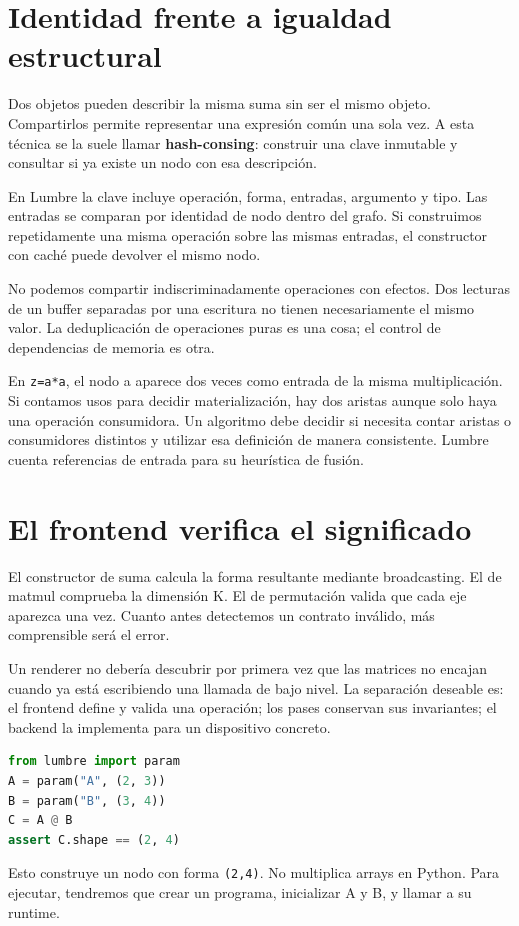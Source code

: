 \documentclass[12pt,a4paper,oneside]{report}
\begin{document}
\section{Identidad frente a igualdad estructural}
Dos objetos pueden describir la misma suma sin ser el mismo objeto. Compartirlos permite representar una expresión común una sola vez. A esta técnica se la suele llamar \textbf{hash-consing}: construir una clave inmutable y consultar si ya existe un nodo con esa descripción.

En Lumbre la clave incluye operación, forma, entradas, argumento y tipo. Las entradas se comparan por identidad de nodo dentro del grafo. Si construimos repetidamente una misma operación sobre las mismas entradas, el constructor con caché puede devolver el mismo nodo.

No podemos compartir indiscriminadamente operaciones con efectos. Dos lecturas de un buffer separadas por una escritura no tienen necesariamente el mismo valor. La deduplicación de operaciones puras es una cosa; el control de dependencias de memoria es otra.

\begin{ejemplo}
En \texttt{z=a*a}, el nodo a aparece dos veces como entrada de la misma multiplicación. Si contamos usos para decidir materialización, hay dos aristas aunque solo haya una operación consumidora. Un algoritmo debe decidir si necesita contar aristas o consumidores distintos y utilizar esa definición de manera consistente. Lumbre cuenta referencias de entrada para su heurística de fusión.

\end{ejemplo}
\section{El frontend verifica el significado}
El constructor de suma calcula la forma resultante mediante broadcasting. El de matmul comprueba la dimensión K. El de permutación valida que cada eje aparezca una vez. Cuanto antes detectemos un contrato inválido, más comprensible será el error.

Un renderer no debería descubrir por primera vez que las matrices no encajan cuando ya está escribiendo una llamada de bajo nivel. La separación deseable es: el frontend define y valida una operación; los pases conservan sus invariantes; el backend la implementa para un dispositivo concreto.

\begin{lstlisting}[language=Python]
from lumbre import param
A = param("A", (2, 3))
B = param("B", (3, 4))
C = A @ B
assert C.shape == (2, 4)
\end{lstlisting}
Esto construye un nodo con forma \texttt{(2,4)}. No multiplica arrays en Python. Para ejecutar, tendremos que crear un programa, inicializar A y B, y llamar a su runtime.
\end{document}
